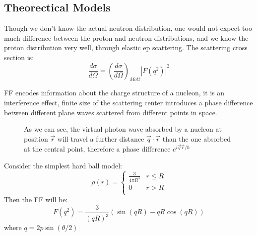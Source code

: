 \subsection{Theorectical Models} 
\label{subsec:models}
Though we don't know the actual neutron distribution, one would not expect too
much difference between the proton and neutron distributions, and we know the
proton distribution very well, through elastic ep scattering. 
The scattering cross section is:
\begin{equation}
    \frac{d\sigma}{d\Omega} = \left( \frac{d\sigma}{d\Omega} \right)_{Mott} |F(q^2)|^2
\end{equation}

FF encodes information about the charge structure of a nucleon, it is an interference
effect, finite size of the scattering center introduces a phase difference between
different plane waves scattered from different points in space.
\begin{figure}    
    \centering
    \caption{As we can see, the virtual photon wave absorbed by a nucleon at position
    $\vec{r}$ will travel a further distance $\vec{q}\cdot\vec{r}$ than the one
    absorbed at the central point, therefore a phase difference $e^{i\vec{q}\vec{r}/\hbar}$}
    \label{fig:FF_phase_diff}
\end{figure}

Consider the simplest hard ball model:
\begin{equation*}
    \rho(r) = 
    \begin{cases}
	\frac{3}{4\pi R^3}  & r \le R	\\
	0		    & r > R   \\
    \end{cases}
    \label{eqn:hard_ball_model}
\end{equation*}
Then the FF will be:
\begin{equation*}
    F(q^2) = \frac{3}{(qR)^3} \left( \sin(qR) - qR\cos(qR) \right)
\end{equation*}
where $q = 2p\sin(\theta/2)$


